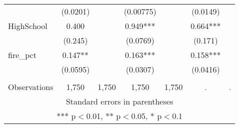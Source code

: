 \begin{tabular}{lcccccc}
 & (0.0201) &  & (0.00775) &  & (0.0149) &  \\
HighSchool & 0.400 &  & 0.949*** &  & 0.664*** &  \\
 & (0.245) &  & (0.0769) &  & (0.171) &  \\
fire\_pct & 0.147** &  & 0.163*** &  & 0.158*** &  \\
 & (0.0595) &  & (0.0307) &  & (0.0416) &  \\
 &  &  &  &  &  &  \\
 Observations & 1,750 & 1,750 & 1,750 & 1,750 & . & . \\ \hline
\multicolumn{7}{c}{ Standard errors in parentheses} \\
\multicolumn{7}{c}{ *** p$<$0.01, ** p$<$0.05, * p$<$0.1} \\
\end{tabular}
